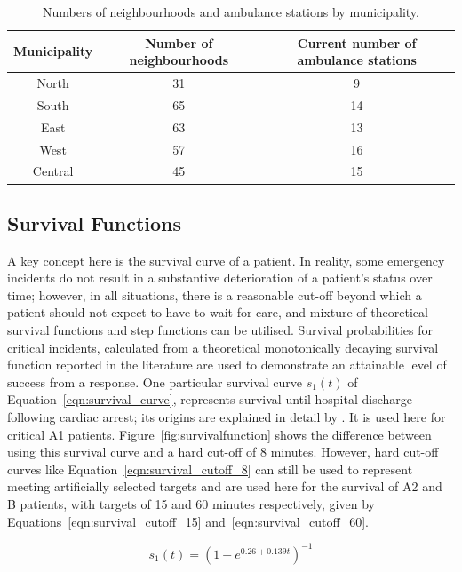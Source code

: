 \documentclass[preprint,12pt]{elsarticle}
\begin{document}
\begin{table} \begin{center} \begin{tabular}{ccc} \toprule Municipality & Number
    of neighbourhoods & Current number of ambulance stations \\ \midrule North
    & 31 & 9 \\ South   & 65 & 14 \\ East    & 63 & 13 \\ West    & 57 & 16 \\
    Central & 45 & 15 \\ \bottomrule \end{tabular} \caption{Numbers of
    neighbourhoods and ambulance stations by municipality.} \label{tbl:jakarta}
    \end{center} \end{table}

\subsection{Survival Functions}\label{sec:survival} A key concept here is the
survival curve of a patient.  In reality, some emergency incidents do not result
in a substantive deterioration of a patient’s status over time; however, in all
situations, there is a reasonable cut-off beyond which a patient should not
expect to have to wait for care, and mixture of theoretical survival functions
and step functions can be utilised.  Survival probabilities for critical
incidents, calculated from a theoretical monotonically decaying survival
function reported in the literature \cite{Valenzuela20001206} are used to
demonstrate an attainable level of success from a response. One particular
survival curve $s_1(t)$ of Equation~\ref{eqn:survival_curve}, represents
survival until hospital discharge following cardiac arrest; its origins are
explained in detail by \cite{Knight2012918}. It is used here for critical A1
patients. Figure~\ref{fig:survivalfunction} shows the difference between using
this survival curve and a hard cut-off of 8 minutes.  However, hard cut-off
curves like Equation~\ref{eqn:survival_cutoff_8} can still be used to represent
meeting artificially selected targets and are used here for the survival of A2
and B patients, with targets of 15 and 60 minutes respectively, given by
Equations~\ref{eqn:survival_cutoff_15} and~\ref{eqn:survival_cutoff_60}.

\begin{equation}\label{eqn:survival_curve} s_1(t) = \left(1 +
e^{0.26+0.139t}\right)^{-1} \end{equation}
\end{document}
